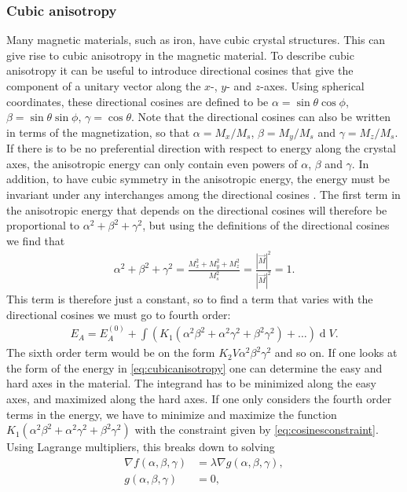 \documentclass[12pt, a4paper, twoside, openright]{article}		%
\renewcommand{\d}[1]{\ensuremath{\operatorname{d}\!{#1}}}
\numberwithin{equation}{section}
\begin{document}
\subsubsection{Cubic anisotropy}
Many magnetic materials, such as iron, have cubic crystal structures. This can give rise to cubic anisotropy in the magnetic material. To describe cubic anisotropy it can be useful to introduce directional cosines that give the component of a unitary vector along the $x$-, $y$- and $z$-axes. Using spherical coordinates, these directional cosines are defined to be $\alpha = \sin\theta\cos\phi$, $\beta = \sin\theta\sin\phi$, $\gamma = \cos\theta$. Note that the directional cosines can also be written in terms of the magnetization, so that $\alpha = M_x/M_s$, $\beta = M_y/M_s$ and $\gamma = M_z/M_s$. If there is to be no preferential direction with respect to energy along the crystal axes, the anisotropic energy can only contain even powers of $\alpha$, $\beta$ and $\gamma$. In addition, to have cubic symmetry in the anisotropic energy, the energy must be invariant under any interchanges among the directional cosines \cite{Kittel:ISSP}. The first term in the anisotropic energy that depends on the directional cosines will therefore be proportional to $\alpha^2+\beta^2+\gamma^2$, but using the definitions of the directional cosines we find that
\begin{align}
\label{eq:cosinesconstraint}
\alpha^2+\beta^2+\gamma^2 = \frac{M_x^2+M_y^2+M_z^2}{M_s^2} = \frac{|\vec{M}|^2}{|\vec{M}|^2} = 1.
\end{align}
This term is therefore just a constant, so to find a term that varies with the directional cosines we must go to fourth order:
\begin{align}
\label{eq:cubicanisotropy}
E_A = E_A^{(0)} + \int (K_1 (\alpha^2\beta^2+\alpha^2\gamma^2+\beta^2\gamma^2) + \ldots ) \d V.
\end{align}
The sixth order term would be on the form $K_2 V \alpha^2\beta^2\gamma^2$ and so on. If one looks at the form of the energy in \eqref{eq:cubicanisotropy} one can determine the easy and hard axes in the material. The integrand has to be minimized along the easy axes, and maximized along the hard axes. If one only considers the fourth order terms in the energy, we have to minimize and maximize the function $K_1 (\alpha^2\beta^2+\alpha^2\gamma^2+\beta^2\gamma^2)$ with the constraint given by \eqref{eq:cosinesconstraint}. Using Lagrange multipliers, this breaks down to solving 
\begin{align}
\nabla f(\alpha, \beta, \gamma) &= \lambda \nabla g(\alpha, \beta, \gamma), \\
g(\alpha, \beta, \gamma) &= 0,
\end{align}
\end{document}

